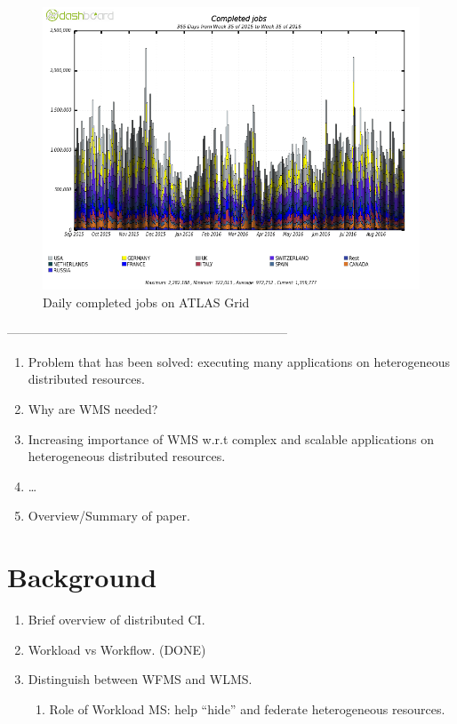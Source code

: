 \documentclass[10pt, conference, compsocconf]{IEEEtran}
\begin{document}
\begin{figure}
\begin{center}
\includegraphics[width=\columnwidth]{figures/DailyJobs.png}
\caption{Daily completed jobs on ATLAS Grid\label{fig:daily}}
\end{center}
\end{figure}

--------------------------------------------------------------------
\begin{enumerate}
  \item Problem that has been solved: executing many applications on heterogeneous distributed resources.
  \item Why are WMS needed?
  \item Increasing importance of WMS w.r.t complex and scalable applications on heterogeneous distributed resources.
  \item \ldots
  \item Overview/Summary of paper.
\end{enumerate}

\section{Background}
\label{sec:background}

\begin{enumerate}
  \item Brief overview of distributed CI.
  \item Workload vs Workflow. (DONE)
  \item Distinguish between WFMS and WLMS.
  \begin{enumerate}
    \item Role of Workload MS: help ``hide'' and federate heterogeneous resources.
  \end{enumerate}
\end{enumerate}
\end{document}
